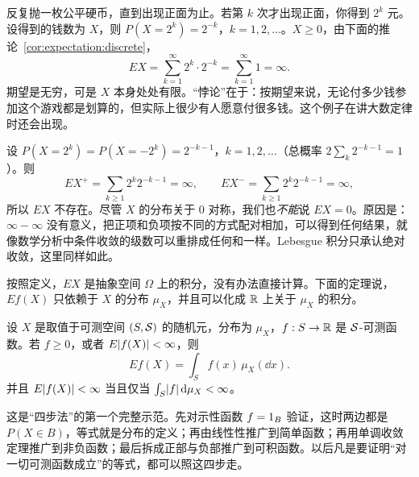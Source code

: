 \begin{example}\label{ex:expectation:st-petersburg}
反复抛一枚公平硬币，直到出现正面为止。若第 $k$ 次才出现正面，你得到 $2^k$ 元。设得到的钱数为 $X$，则 $P(X=2^k)=2^{-k}$，$k=1,2,\dots$。$X\geqslant0$，由下面的推论~\ref{cor:expectation:discrete}，
\[
EX=\sum_{k=1}^\infty2^k\cdot2^{-k}=\sum_{k=1}^\infty1=\infty .
\]
期望是无穷，可是 $X$ 本身处处有限。“悖论”在于：按期望来说，无论付多少钱参加这个游戏都是划算的，但实际上很少有人愿意付很多钱。这个例子在讲大数定律时还会出现。
\end{example}

\begin{example}[期望不存在]\label{ex:expectation:no-mean}
设 $P(X=2^k)=P(X=-2^k)=2^{-k-1}$，$k=1,2,\dots$（总概率 $2\sum_k2^{-k-1}=1$）。则
\[
EX^+=\sum_{k\geqslant1}2^k2^{-k-1}=\infty,\qquad EX^-=\sum_{k\geqslant1}2^k2^{-k-1}=\infty,
\]
所以 $EX$ 不存在。尽管 $X$ 的分布关于 $0$ 对称，我们也\emph{不能}说 $EX=0$。原因是：$\infty-\infty$ 没有意义，把正项和负项按不同的方式配对相加，可以得到任何结果，就像数学分析中条件收敛的级数可以重排成任何和一样。Lebesgue 积分只承认绝对收敛，这里同样如此。
\end{example}


按照定义，$EX$ 是抽象空间 $\Omega$ 上的积分，没有办法直接计算。下面的定理说，$Ef(X)$ 只依赖于 $X$ 的分布 $\mu_X$，并且可以化成 $\mathbb{R}$ 上关于 $\mu_X$ 的积分。

\begin{theorem}[变量替换公式]\label{thm:expectation:change-of-variables}
设 $X$ 是取值于可测空间 $(S,\mathcal{S})$ 的随机元，分布为 $\mu_X$，$f:S\to\mathbb{R}$ 是 $\mathcal{S}$-可测函数。若 $f\geqslant0$，或者 $E\lvert f(X)\rvert<\infty$，则
\[
Ef(X)=\int_Sf(x)\,\mu_X(\dd x).
\]
并且 $E\lvert f(X)\rvert<\infty$ 当且仅当 $\int_S\lvert f\rvert\,\mathrm{d}\mu_X<\infty$。
\end{theorem}

\begin{remark}[证明思路]
这是“四步法”的第一个完整示范。先对示性函数 $f=1_B$ 验证，这时两边都是 $P(X\in B)$，等式就是分布的定义；再由线性性推广到简单函数；再用单调收敛定理推广到非负函数；最后拆成正部与负部推广到可积函数。以后凡是要证明“对一切可测函数成立”的等式，都可以照这四步走。
\end{remark}

